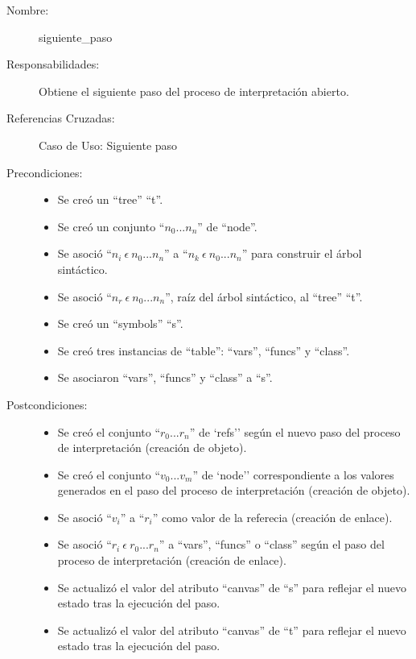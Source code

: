 	\begin{description}
		\item [Nombre:] siguiente\_paso
		\item [Responsabilidades:] Obtiene el siguiente paso del proceso de interpretación abierto.
		\item [Referencias Cruzadas: ] Caso de Uso: Siguiente paso
      \item [Precondiciones:] \hfill
         \begin {itemize}
         \item Se creó un ``tree'' ``t''.
         \item Se creó un conjunto ``$n_0...n_n$'' de ``node''.
         \item Se asoció ``$n_i\ \epsilon\ n_0...n_n$'' a ``$n_k\ \epsilon\ n_0...n_n$'' para construir el árbol sintáctico.
         \item Se asoció  ``$n_r\ \epsilon\ n_0...n_n$'', raíz del árbol sintáctico, al ``tree'' ``t''.
         \item Se creó un ``symbols'' ``s''.
         \item Se creó tres instancias de ``table'': ``vars'', ``funcs'' y ``class''.
         \item Se asociaron ``vars'', ``funcs'' y ``class'' a ``s''.
      \end{itemize}
      \item [Postcondiciones:] \hfill
      \begin {itemize}
         \item Se creó el conjunto ``$r_0...r_n$'' de `refs'' según el nuevo paso del proceso de interpretación (creación de objeto).
         \item Se creó el conjunto ``$v_0...v_m$'' de `node'' correspondiente a los valores generados en el paso del proceso de interpretación (creación de objeto).
         \item Se asoció ``$v_i$'' a ``$r_i$'' como valor de la referecia (creación de enlace).
         \item Se asoció ``$r_i\ \epsilon \ r_0...r_n$'' a ``vars'', ``funcs'' o ``class'' según el paso del proceso de interpretación (creación de enlace).  
         \item Se actualizó el valor del atributo ``canvas'' de ``s'' para reflejar el nuevo estado tras la ejecución del paso.
         \item Se actualizó el valor del atributo ``canvas'' de ``t'' para reflejar el nuevo estado tras la ejecución del paso.
      \end{itemize}
	\end{description}



